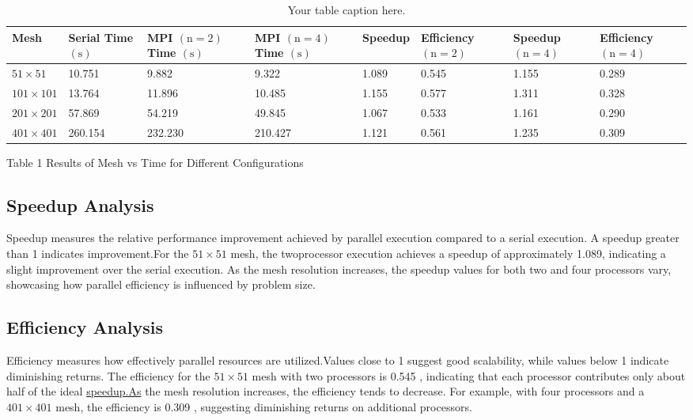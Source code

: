 \documentclass[10pt]{article}
\begin{document}
\begin{table}
    \centering
    \begin{tabular}{|l|*{7}{l|}}
        \hline
        Mesh & \makecell[l]{Serial \\ Time $(\mathrm{s})$} & \makecell[l]{MPI \\ $(\mathrm{n}=2)$ \\ Time $(\mathrm{s})$} & \makecell[l]{MPI \\ $(\mathrm{n}=4)$ \\ Time $(\mathrm{s})$} & Speedup & \makecell[l]{Efficiency \\ $(\mathrm{n}=2)$} & \makecell[l]{Speedup \\ $(\mathrm{n}=4)$} & \makecell[l]{Efficiency \\ $(\mathrm{n}=4)$} \\
        \hline
        $51 \times 51$ & 10.751 & 9.882 & 9.322 & 1.089 & 0.545 & 1.155 & 0.289 \\
        \hline
        $101 \times 101$ & 13.764 & 11.896 & 10.485 & 1.155 & 0.577 & 1.311 & 0.328 \\
        \hline
        $201 \times 201$ & 57.869 & 54.219 & 49.845 & 1.067 & 0.533 & 1.161 & 0.290 \\
        \hline
        $401 \times 401$ & 260.154 & 232.230 & 210.427 & 1.121 & 0.561 & 1.235 & 0.309 \\
        \hline
    \end{tabular}
    \caption{Your table caption here.}
    \label{tab:yourtablelabel}
\end{table}

Table 1 Results of Mesh vs Time for Different Configurations

\subsection{Speedup Analysis}
Speedup measures the relative performance improvement achieved by parallel execution compared to a serial execution. A speedup greater than 1 indicates improvement.For the $51 \times 51$ mesh, the twoprocessor execution achieves a speedup of approximately 1.089, indicating a slight improvement over the serial execution. As the mesh resolution increases, the speedup values for both two and four processors vary, showcasing how parallel efficiency is influenced by problem size.

\subsection{Efficiency Analysis}
Efficiency measures how effectively parallel resources are utilized.Values close to 1 suggest good scalability, while values below 1 indicate diminishing returns. The efficiency for the $51 \times 51$ mesh with two processors is 0.545 , indicating that each processor contributes only about half of the ideal \href{http://speedup.As}{speedup.As} the mesh resolution increases, the efficiency tends to decrease. For example, with four processors and a $401 \times 401$ mesh, the efficiency is 0.309 , suggesting diminishing returns on additional processors.
\end{document}
